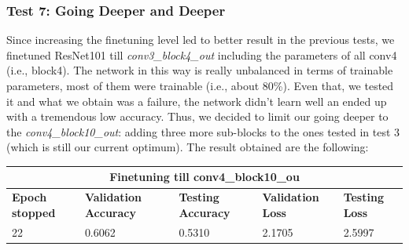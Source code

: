 \subsubsection{Test 7: Going Deeper and Deeper}
Since increasing the finetuning level led to better result in the previous tests, we finetuned ResNet101 till \textit{conv3\_block4\_out} including the parameters of all conv4 (i.e., block4). The network in this way is really unbalanced in terms of trainable parameters, most of them were trainable (i.e., about 80\%). Even that, we tested it and what we obtain was a failure, the network didn't learn well an ended up with a tremendous low accuracy. Thus, we decided to limit our going deeper to the \textit{conv4\_block10\_out}: adding three more sub-blocks to the ones tested in test 3 (which is still our current optimum).
\noindent The result obtained are the following:

\medskip

\begin{tabular}{ |p{2cm}|p{2cm}|p{2cm}|p{2cm}|p{2cm}|  }
\hline
\multicolumn{5}{|c|}{Finetuning till conv4\_block10\_ou} \\
\hline
\textbf{Epoch stopped} & \textbf{Validation Accuracy} & \textbf{Testing Accuracy} & \textbf{Validation Loss} & \textbf{Testing Loss} \\
\hline
22 & 0.6062 & 0.5310 & 2.1705 & 2.5997\\
\hline
\end{tabular}

